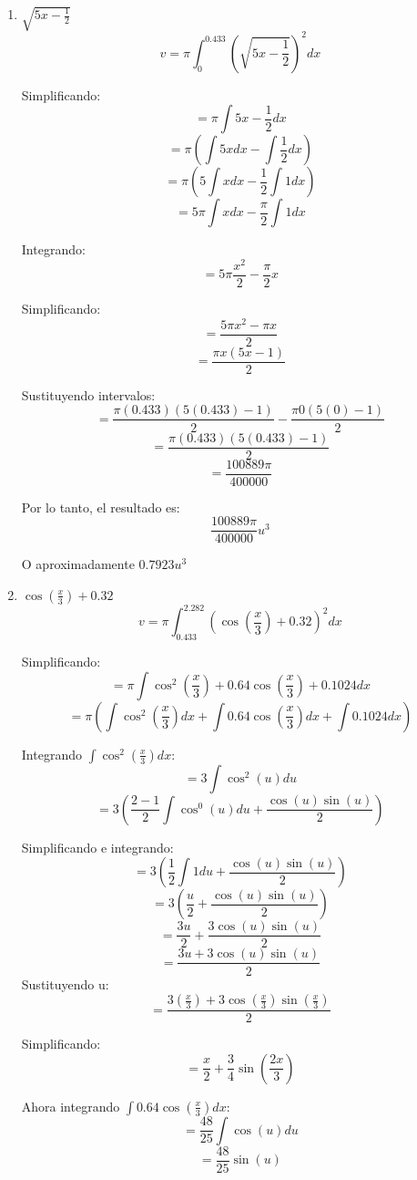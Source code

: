 \documentclass{article}
\begin{document}
\begin{enumerate}
    \item $\sqrt{5 x-\frac{1}{2}}$
    $$ v = \pi \int_{0}^{0.433} (\sqrt{5 x-\frac{1}{2}})^2 dx$$
    
    Simplificando:
    $$ = \pi \int 5 x-\frac{1}{2} dx$$
    $$ = \pi (\int 5x dx - \int\frac{1}{2}dx) $$
    $$ = \pi (5\int x dx - \frac{1}{2}\int1 dx) $$
    $$ = 5\pi\int x dx - \frac{\pi}{2}\int1 dx $$
    
    Integrando:
    $$ = 5\pi\frac{x^2}{2} - \frac{\pi}{2}x $$
    
    Simplificando:
    $$ = \frac{5\pi x^2- \pi x}{2}$$
    $$ = \frac{\pi x (5x - 1)}{2}$$
    
    Sustituyendo intervalos:
    $$ = \frac{\pi (0.433) (5(0.433) - 1)}{2} - \frac{\pi 0 (5(0) - 1)}{2}$$
    $$ = \frac{\pi (0.433) (5(0.433) - 1)}{2} $$
    $$ = \frac{100889{\pi}}{400000} $$
    
    Por lo tanto, el resultado es:
    $$\frac{100889{\pi}}{400000} u^3 $$
    
    O aproximadamente $0.7923 u^3$
    
    \pagebreak
    \item $\cos \left(\frac{x}{3}\right)+0.32$
    $$ v = \pi \int_{0.433}^{2.282} (\cos \left(\frac{x}{3}\right)+0.32)^2 dx$$
    
    Simplificando:
    $$ = \pi \int \cos ^2\left(\frac{x}{3}\right)+0.64 \cos \left(\frac{x}{3}\right)+0.1024 dx $$
    $$ = \pi (\int \cos ^2\left(\frac{x}{3}\right) dx + \int 0.64 \cos \left(\frac{x}{3}\right) dx + \int 0.1024 dx) $$
    
    Integrando $\int \cos ^2\left(\frac{x}{3}\right) dx$:
    $$ = 3\int \cos^2(u)du$$
    $$ = 3(\frac{2-1}{2} \int \cos ^0 (u) du + \frac{\cos(u) \sin(u)}{2})$$
    
    Simplificando e integrando:
    $$ = 3(\frac{1}{2} \int 1 du + \frac{\cos(u) \sin(u)}{2})$$
    $$ = 3(\frac{u}{2} + \frac{\cos(u) \sin(u)}{2})$$
    $$ = \frac{3u}{2} + \frac{3 \cos(u) \sin(u)}{2}$$
    $$ = \frac{3u + 3\cos(u) \sin(u)}{2}$$
    Sustituyendo u:
    $$ = \frac{3(\frac{x}{3}) + 3\cos(\frac{x}{3}) \sin(\frac{x}{3})}{2}$$
    
    Simplificando:
    $$ = \frac{x}{2}+\frac{3}{4} \sin \left(\frac{2 x}{3}\right)$$
    
    Ahora integrando $\int 0.64 \cos \left(\frac{x}{3}\right) dx$:
    $$ = \frac{48}{25} \int \cos(u)du$$
    $$ = \frac{48}{25} \sin(u) $$
    

\end{enumerate}
\end{document}
